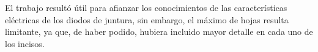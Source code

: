 \documentclass[10pt]{article}
\begin{document}
\quad El trabajo resultó útil para afianzar los conocimientos de las características eléctricas de los diodos de juntura, sin embargo, el máximo de hojas resulta limitante, ya que, de haber podido, hubiera incluido mayor detalle en cada uno de los incisos.

\end{document}
